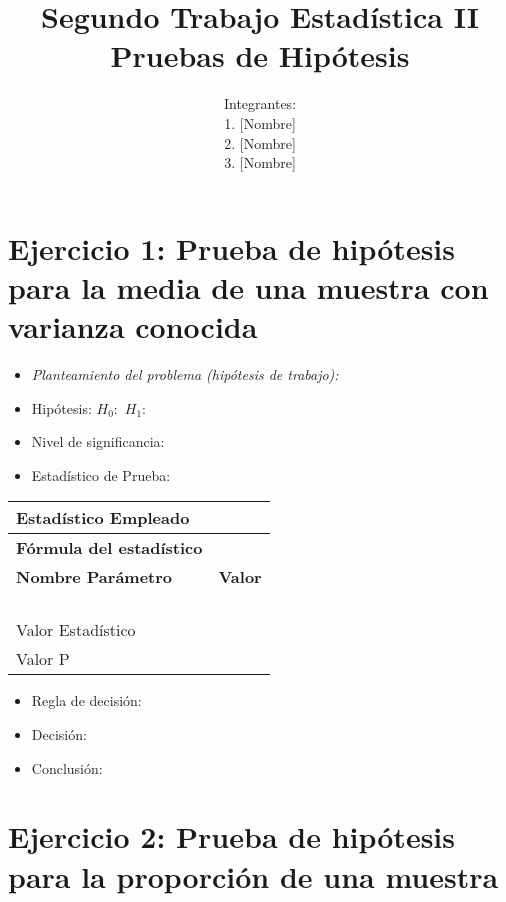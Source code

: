 \documentclass[12pt,a4paper]{article}
\title{\textbf{Segundo Trabajo Estadística II} \\[0.5cm]
Pruebas de Hipótesis}
\author{
Integrantes: \\ 
1. [Nombre] \\ 
2. [Nombre] \\ 
3. [Nombre]}
\date{}
\begin{document}
\maketitle

\section*{Ejercicio 1: Prueba de hipótesis para la media de una muestra con varianza conocida}
\begin{itemize}
    \item \textit{Planteamiento del problema (hipótesis de trabajo):}
    \item Hipótesis: \quad $H_{0}:$ \hspace{2cm} $H_{1}:$
    \item Nivel de significancia:
    \item Estadístico de Prueba:
\end{itemize}

\begin{tabular}{|m{7cm}|m{7cm}|}
\hline
\textbf{Estadístico Empleado} &  \\ \hline
\textbf{Fórmula del estadístico} &  \\ \hline
\textbf{Nombre Parámetro} & \textbf{Valor} \\ \hline
 &  \\ \hline
 &  \\ \hline
 &  \\ \hline
 &  \\ \hline
Valor Estadístico &  \\ \hline
Valor P &  \\ \hline
\end{tabular}

\begin{itemize}
    \item Regla de decisión:
    \item Decisión:
    \item Conclusión:
\end{itemize}


\section*{Ejercicio 2: Prueba de hipótesis para la proporción de una muestra}
\end{document}
